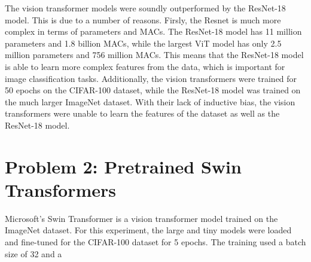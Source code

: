 \documentclass{article}
\begin{document}
The vision transformer models were soundly
outperformed by the ResNet-18 model. This is
due to a number of reasons. Firsly, the
Resnet is much more complex in terms of
parameters and MACs. The ResNet-18 model has
11 million parameters and 1.8 billion MACs,
while the largest ViT model has only 2.5
million parameters and 756 million MACs. This
means that the ResNet-18 model is able to
learn more complex features from the data,
which is important for image classification
tasks. Additionally, the vision transformers
were trained for 50 epochs on the CIFAR-100
dataset, while the ResNet-18 model was
trained on the much larger ImageNet dataset.
With their lack of inductive bias, the vision
transformers were unable to learn the
features of the dataset as well as the
ResNet-18 model.

\section{Problem 2: Pretrained Swin Transformers}
Microsoft's Swin Transformer is a vision
transformer model trained on the ImageNet
dataset. For this experiment, the large and
tiny models were loaded and fine-tuned for
the CIFAR-100 dataset for 5 epochs. The training used a batch size of 32 and a 
\end{document}
